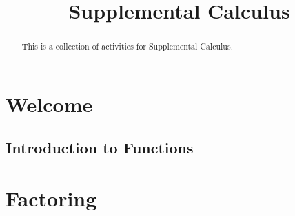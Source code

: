 \documentclass{xourse}
\title{Supplemental Calculus}
\begin{document}
\begin{abstract}
This is a collection of activities for Supplemental Calculus.
\end{abstract}

\maketitle

\part{Welcome}


%
%
%
\chapter{Introduction to Functions}

%
%

\part{Factoring}

\end{document}
